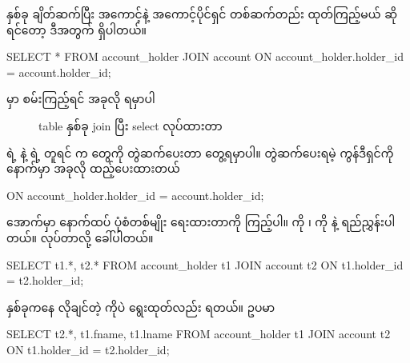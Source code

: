 နှစ်ခု ချိတ်ဆက်ပြီး အကောင့်နဲ့ အကောင့်ပိုင်ရှင် တစ်ဆက်တည်း ထုတ်ကြည့်မယ် ဆိုရင်တော့ ဒီအတွက်   ရှိပါတယ်။
%
\begin{sql}
SELECT * FROM account_holder JOIN account
ON account_holder.holder_id = account.holder_id;
\end{sql}
%
 မှာ စမ်းကြည့်ရင် အခုလို ရမှာပါ

\begin{figure}[H]
\caption{table နှစ်ခု join ပြီး select လုပ်ထားတာ} 
\label{fig:join}
\end{figure}
  ရဲ့  နဲ့    ရဲ့  တူရင်  က  တွေကို တွဲဆက်ပေးတာ တွေ့ရမှာပါ။ တွဲဆက်ပေးရမဲ့ ကွန်ဒီရှင်ကို  နောက်မှာ အခုလို ထည့်ပေးထားတယ်
%
\begin{sql}
ON account_holder.holder_id = account.holder_id;
\end{sql}
%
အောက်မှာ နောက်ထပ် ပုံစံတစ်မျိုး ရေးထားတာကို ကြည့်ပါ။   ကို  ၊  ကို  နဲ့ ရည်ညွှန်းပါတယ်။  လုပ်တာလို့ ခေါ်ပါတယ်။
%
\begin{sql}
SELECT 
    t1.*,
    t2.* 
FROM account_holder t1 JOIN account t2
    ON t1.holder_id = t2.holder_id;
\end{sql}
%
 နှစ်ခုကနေ လိုချင်တဲ့  ကိုပဲ ရွေးထုတ်လည်း ရတယ်။ ဥပမာ
%
\begin{sql}
SELECT 
    t2.*,
    t1.fname,
    t1.lname
FROM account_holder t1 JOIN account t2
    ON t1.holder_id = t2.holder_id;
\end{sql}
%


